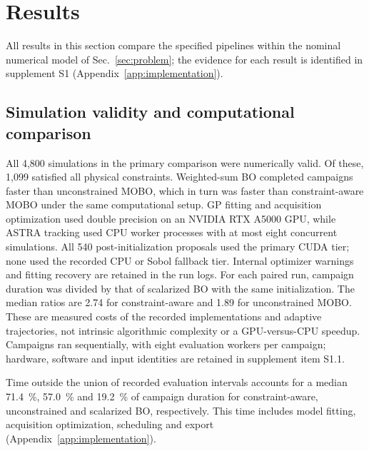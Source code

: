 \documentclass[aps,prab,reprint,superscriptaddress,amsmath,amssymb,floatfix]{revtex4-2}
\begin{document}
\section{Results}
\label{sec:results}
All results in this section compare the specified pipelines within the nominal numerical
model of Sec.~\ref{sec:problem}; the evidence for each
result is identified in supplement S1 (Appendix~\ref{app:implementation}).

\subsection{Simulation validity and computational comparison}
All 4,800 simulations in the primary comparison were numerically valid. Of these, 1,099
satisfied all physical constraints. Weighted-sum BO completed campaigns faster than unconstrained
MOBO, which in turn
was faster than constraint-aware MOBO under the same computational setup. GP fitting and
acquisition optimization used double precision on an NVIDIA RTX A5000 GPU, while ASTRA tracking
used CPU worker processes with at most eight concurrent simulations.
All 540 post-initialization
proposals used the primary CUDA tier; none used the recorded CPU or Sobol fallback tier.
Internal optimizer warnings and fitting recovery are retained in the run logs.
For each paired run, campaign duration was divided by that of scalarized BO with the same
initialization. The median ratios are 2.74 for constraint-aware and 1.89 for unconstrained
MOBO. These are measured costs of the recorded implementations and adaptive trajectories,
not intrinsic algorithmic complexity or a GPU-versus-CPU speedup. Campaigns ran sequentially,
with eight evaluation workers per campaign; hardware, software and input identities are
retained in supplement item S1.1.

Time outside the union of recorded evaluation intervals accounts for a median
\SI{71.4}{\percent}, \SI{57.0}{\percent} and \SI{19.2}{\percent} of campaign duration for
constraint-aware, unconstrained and scalarized BO, respectively. This time includes model
fitting, acquisition optimization, scheduling and export (Appendix~\ref{app:implementation}).
\end{document}
